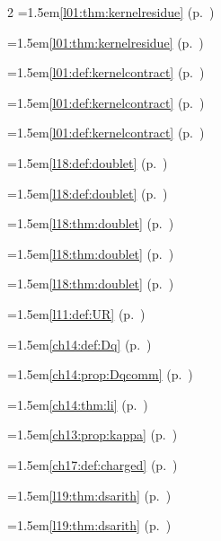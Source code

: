 \begin{multicols}{2}
\hangindent=1.5em\quad \ref{l01:thm:kernelresidue} (p.~\pageref{l01:thm:kernelresidue})\par
\hangindent=1.5em\quad \ref{l01:thm:kernelresidue} (p.~\pageref{l01:thm:kernelresidue})\par
\hangindent=1.5em\quad \ref{l01:def:kernelcontract} (p.~\pageref{l01:def:kernelcontract})\par
\hangindent=1.5em\quad \ref{l01:def:kernelcontract} (p.~\pageref{l01:def:kernelcontract})\par
\hangindent=1.5em\quad \ref{l01:def:kernelcontract} (p.~\pageref{l01:def:kernelcontract})\par
\hangindent=1.5em\quad \ref{l18:def:doublet} (p.~\pageref{l18:def:doublet})\par
\hangindent=1.5em\quad \ref{l18:def:doublet} (p.~\pageref{l18:def:doublet})\par
\hangindent=1.5em\quad \ref{l18:thm:doublet} (p.~\pageref{l18:thm:doublet})\par
\hangindent=1.5em\quad \ref{l18:thm:doublet} (p.~\pageref{l18:thm:doublet})\par
\hangindent=1.5em\quad \ref{l18:thm:doublet} (p.~\pageref{l18:thm:doublet})\par
\hangindent=1.5em\quad \ref{l11:def:UR} (p.~\pageref{l11:def:UR})\par
\hangindent=1.5em\quad \ref{ch14:def:Dq} (p.~\pageref{ch14:def:Dq})\par
\hangindent=1.5em\quad \ref{ch14:prop:Dqcomm} (p.~\pageref{ch14:prop:Dqcomm})\par
\hangindent=1.5em\quad \ref{ch14:thm:li} (p.~\pageref{ch14:thm:li})\par
\hangindent=1.5em\quad \ref{ch13:prop:kappa} (p.~\pageref{ch13:prop:kappa})\par
\hangindent=1.5em\quad \ref{ch17:def:charged} (p.~\pageref{ch17:def:charged})\par
\hangindent=1.5em\quad \ref{l19:thm:dsarith} (p.~\pageref{l19:thm:dsarith})\par
\hangindent=1.5em\quad \ref{l19:thm:dsarith} (p.~\pageref{l19:thm:dsarith})\par

\end{multicols}
